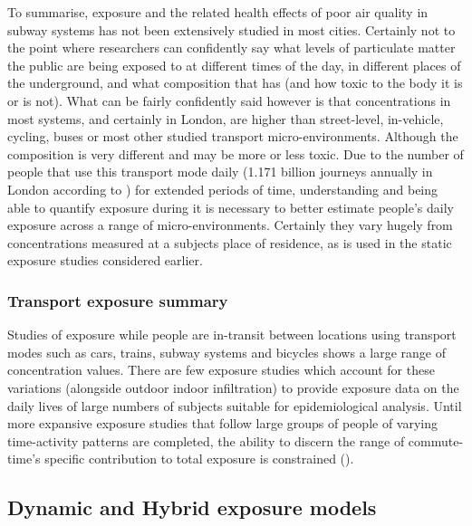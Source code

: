 To summarise, exposure and the related health effects of poor air quality in subway systems has not been extensively studied in most cities. Certainly not to the point where researchers can confidently say what levels of particulate matter the public are being exposed to at different times of the day, in different places of the underground, and what composition that has (and how toxic to the body it is or is not). What can be fairly confidently said however is that concentrations in most systems, and certainly in London, are higher than street-level, in-vehicle, cycling, buses or most other studied transport micro-environments. Although the composition is very different and may be more or less toxic. Due to the number of people that use this transport mode daily (1.171 billion journeys annually in London according to \cite{TransportforLondon2014a}) for extended periods of time, understanding and being able to quantify exposure during it is necessary to better estimate people's daily exposure across a range of micro-environments. Certainly they vary hugely from concentrations measured at a subjects place of residence, as is used in the static exposure studies considered earlier.

\subsubsection{Transport exposure summary}
\label{sec:trans_exposure_summary}

Studies of exposure while people are in-transit between locations using transport modes such as cars, trains, subway systems and bicycles shows a large range of concentration values. There are few exposure studies which account for these variations (alongside outdoor indoor infiltration) to provide exposure data on the daily lives of large numbers of subjects suitable for epidemiological analysis. Until more expansive exposure studies that follow large groups of people of varying time-activity patterns are completed, the ability to discern the range of commute-time’s specific contribution to total exposure is constrained (\cite{Knibbs2011}).

\newpage

\subsection{Dynamic and Hybrid exposure models}
\label{sec:dynamic_hybrid_models}

